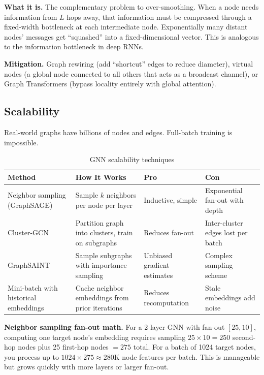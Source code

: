 \textbf{What it is.} The complementary problem to over-smoothing. When a node needs information from $L$ hops away, that information must be compressed through a fixed-width bottleneck at each intermediate node. Exponentially many distant nodes' messages get ``squashed'' into a fixed-dimensional vector. This is analogous to the information bottleneck in deep RNNs.

\textbf{Mitigation.} Graph rewiring (add ``shortcut'' edges to reduce diameter), virtual nodes (a global node connected to all others that acts as a broadcast channel), or Graph Transformers (bypass locality entirely with global attention).

\subsection{Scalability}

Real-world graphs have billions of nodes and edges. Full-batch training is impossible.

\begin{table}[H]
\centering
\caption{GNN scalability techniques}
\begin{tabularx}{\textwidth}{lXXX}
\toprule
\textbf{Method} & \textbf{How It Works} & \textbf{Pro} & \textbf{Con} \\
\midrule
Neighbor sampling (GraphSAGE) & Sample $k$ neighbors per node per layer & Inductive, simple & Exponential fan-out with depth \\
Cluster-GCN & Partition graph into clusters, train on subgraphs & Reduces fan-out & Inter-cluster edges lost per batch \\
GraphSAINT & Sample subgraphs with importance sampling & Unbiased gradient estimates & Complex sampling scheme \\
Mini-batch with historical embeddings & Cache neighbor embeddings from prior iterations & Reduces recomputation & Stale embeddings add noise \\
\bottomrule
\end{tabularx}
\end{table}

\textbf{Neighbor sampling fan-out math.} For a 2-layer GNN with fan-out $[25, 10]$, computing one target node's embedding requires sampling $25 \times 10 = 250$ second-hop nodes plus 25 first-hop nodes $= 275$ total. For a batch of 1024 target nodes, you process up to $1024 \times 275 \approx 280$K node features per batch. This is manageable but grows quickly with more layers or larger fan-out.


